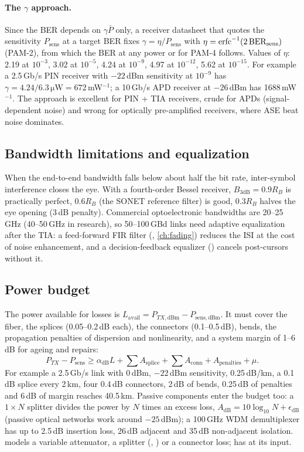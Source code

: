 \paragraph{The $\gamma$ approach.} Since the BER depends on $\gamma\bar P$ only, a receiver datasheet that
quotes the sensitivity $P_{\mathrm{sens}}$ at a target BER fixes $\gamma=\eta/P_{\mathrm{sens}}$ with
$\eta=\operatorname{erfc}^{-1}(2\,\mathrm{BER}_{\mathrm{sens}})$ (PAM-2), from which the BER at any power or for PAM-4 follows. Values
of $\eta$: 2.19 at $10^{-3}$, 3.02 at $10^{-5}$, 4.24 at $10^{-9}$, 4.97 at $10^{-12}$, 5.62 at $10^{-15}$. For example a
2.5\,Gb/s PIN receiver with $-22$\,dBm sensitivity at $10^{-9}$ has $\gamma=4.24/6.3\,\mathrm{\mu W}=672$\,mW$^{-1}$; a 10\,Gb/s
APD receiver at $-26$\,dBm has 1688\,mW$^{-1}$. The approach is excellent for PIN + TIA receivers, crude
for APDs (signal-dependent noise) and wrong for optically pre-amplified receivers, where ASE
beat noise dominates.

\subsection{Bandwidth limitations and equalization}
When the end-to-end bandwidth falls below about half the bit rate, inter-symbol interference
closes the eye. With a fourth-order Bessel receiver, $B_{3\mathrm{dB}}=0.9R_B$ is practically perfect,
$0.6R_B$ (the SONET reference filter) is good, $0.3R_B$ halves the eye opening (3\,dB penalty).
Commercial optoelectronic bandwidths are 20--25\,GHz (40--50\,GHz in research), so 50--100\,GBd
links need adaptive equalization after the TIA: a feed-forward FIR filter (,
\cref{ch:fading}) reduces the ISI at the cost of noise enhancement, and a decision-feedback
equalizer () cancels post-cursors without it.

\subsection{Power budget}
The power available for losses is $L_{\mathrm{avail}}=P_{TX,\mathrm{dBm}}-P_{\mathrm{sens,dBm}}$. It must cover the fiber, the
splices (0.05--0.2\,dB each), the connectors (0.1--0.5\,dB), bends, the propagation penalties of
dispersion and nonlinearity, and a system margin of 1--6\,dB for ageing and repairs:
\begin{equation}
  P_{TX}-P_{\mathrm{sens}}\ge\alpha_{\mathrm{dB}}L+\sum A_{\mathrm{splice}}+\sum A_{\mathrm{conn}}+A_{\mathrm{penalties}}+\mu .
\end{equation}
For example a 2.5\,Gb/s link with 0\,dBm, $-22$\,dBm sensitivity, 0.25\,dB/km, a 0.1\,dB splice every
2\,km, four 0.4\,dB connectors, 2\,dB of bends, 0.25\,dB of penalties and 6\,dB of margin reaches
40.5\,km. Passive components enter the budget too: a $1\times N$ splitter divides the power by $N$
times an excess loss, $A_{\mathrm{dB}}=10\log_{10}N+\epsilon_{\mathrm{dB}}$ (passive optical networks work around
$-25$\,dBm); a 100\,GHz WDM demultiplexer has up to 2.5\,dB insertion loss, 26\,dB adjacent and 35\,dB
non-adjacent isolation.  models a variable attenuator, a splitter
(, ) or a connector loss;  has
 at its input.

